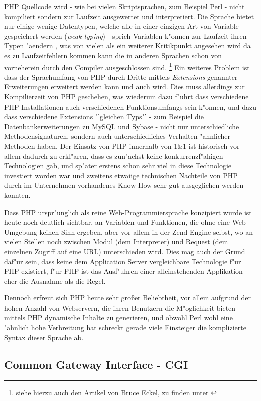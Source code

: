 PHP Quellcode wird - wie bei vielen Skriptsprachen, zum Beispiel Perl - nicht kompiliert sondern zur Laufzeit ausgewertet und interpretiert.
Die Sprache bietet nur einige wenige Datentypen, welche alle in einer einzigen Art von Variable gespeichert werden
(\emph{weak typing}) - sprich Variablen k"onnen zur Laufzeit ihren Typen "aendern
, was von vielen als ein weiterer Kritikpunkt angesehen wird da es zu Laufzeitfehlern kommen kann die in anderen 
Sprachen schon von vorneherein durch den Compiler ausgeschlossen sind.
\footnote{
siehe hierzu auch den Artikel von Bruce Eckel, zu finden unter \cite{TYPING}
}
Ein weiteres Problem ist dass der Sprachumfang von PHP durch Dritte mittels \emph{Extensions}
genannter Erweiterungen erweitert werden kann und auch wird. Dies muss allerdings zur Kompilierzeit von PHP geschehen, was wiederum
dazu f"uhrt dass verschiedene PHP-Installationen auch verschiedenen Funktionsumfangs sein k"onnen, und dazu dass
verschiedene Extensions "'gleichen Typs"' - zum Beispiel die Datenbankerweiterungen zu MySQL und Sybase - nicht
nur unterschiedliche Methodensignaturen, sondern auch unterschiedliches Verhalten "ahnlicher Methoden haben.
Der Einsatz von PHP innerhalb von 1\&1 ist historisch vor allem dadurch zu erkl"aren, dass es zun"achst keine 
konkurrenzf"ahigen Technologien gab, und sp"ater erstens schon sehr viel in diese Technologie investiert
worden war und zweitens etwaiige technischen Nachteile von PHP durch im Unternehmen vorhandenes Know-How sehr gut
ausgeglichen werden konnten.

Dass PHP urspr"unglich als reine Web-Programmiersprache konzipiert wurde ist heute noch deutlich sichtbar, an 
Variablen und Funktionen, die ohne eine Web-Umgebung keinen Sinn ergeben, aber vor allem in der Zend-Engine selbst,
wo an vielen Stellen noch zwischen Modul (dem Interpreter) und Request (dem einzelnen Zugriff auf eine URL) unterschieden
wird. Dies mag auch der Grund daf"ur sein, dass keine dem Application Server vergleichbare Technologie f"ur PHP existiert,
f"ur PHP ist das Ausf"uhren einer alleinstehenden Applikation eher die Ausnahme als die Regel.

Dennoch erfreut sich PHP heute sehr gro\ss er Beliebtheit, vor allem aufgrund der hohen Anzahl von Webservern,
die ihren Benutzern die M"oglichkeit bieten mittels PHP dynamische Inhalte zu generieren, und obwohl Perl
wohl eine "ahnlich hohe Verbreitung hat schreckt gerade viele Einsteiger die komplizierte Syntax dieser Sprache ab.


\subsection{Common Gateway Interface - CGI}
\label{sec:background:cgi}

